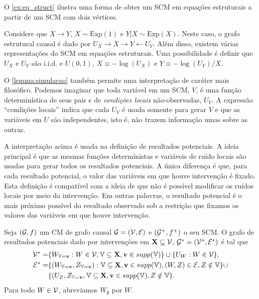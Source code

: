 O \cref{ex:eq_struct} ilustra
uma forma de obter 
um SCM em equações estruturais
a partir de um SCM com dois vértices.
 
\begin{example}
 \label{ex:eq_struct}
 Considere que $X \rightarrow Y$,
 $X \sim \text{Exp}(1)$ e $Y|X \sim \text{Exp}(X)$.
 Neste caso, o grafo estrutural causal é
 dado por $U_X \rightarrow X \rightarrow Y \leftarrow U_Y$.
 Além disso, existem várias representações do SCM
 em equações estruturais. Uma possibilidade é
 definir que $U_X$ e $U_Y$ são i.i.d. e $U(0,1)$,
 $X \equiv -\log(U_X)$ e $Y \equiv -\log(U_Y)/X$.
\end{example}
 
O \cref{lemma:simulacao} também permite
uma interpretação de caráter mais filosófico.
Podemos imaginar que toda variável em um SCM, $V$, é
uma função determinística de seus pais e
de \textit{condições locais} não-observadas, $U_V$.
A expressão ``condições locais'' indica que
cada $U_V$ é usada somente para gerar $V$ e que
as variáveis em $U$ são independentes, isto é,
não trazem informação umas sobre as outras.

A interpretação acima é usada
na definição de resultados potenciais.
A ideia principal é que 
as mesmas funções determínistas e
variáveis de ruído locais são usadas
para gerar todos os resultados potenciais.
A única diferença é que,
para cada resultado potencial,
o valor das variáveis em que 
houve intervenção é fixado.
Esta definição é compatível com 
a ideia de que não é possível modificar
os ruídos locais por meio da intervenção.
Em outras palavras, 
o resultado potencial é o mais próximo possível
do resultado observado sob a restrição que
fixamos os valores das variáveis em que
houve intervenção.

\begin{definition}
 \label{def:grafo_potencial}
 Seja $({\mathcal G}, f)$ um CM de grafo causal 
 ${\mathcal G} = ({\mathcal V}, {\mathcal E})$ e
 $({\mathcal G}^+, f^+)$ o seu SCM.
 O grafo de resultados potenciais dado
 por intervenções em ${\mathbf{X}} \subseteq {\mathcal V}$,
 ${\mathcal G}^* = ({\mathcal V}^*, {\mathcal E}^*)$ é tal que
 \begin{align*}
  {\mathcal V}^* =& \{W_{{\mathbb V}={\mathbf{v}}}: W \in {\mathcal V}, {\mathbb V} \subseteq {\mathbf{X}}, {\mathbf{v}} \in supp({\mathbb V})\} \cup \{U_W: W \in {\mathcal V}\}, \\
  {\mathcal E}^* =& \{(W_{{\mathbb V}={\mathbf{v}}}, Z_{{\mathbb V}={\mathbf{v}}}): {\mathbb V} \subseteq {\mathbf{X}}, {\mathbf{v}} \in supp({\mathbb V}),
  (W, Z) \in {\mathcal E}, Z \notin {\mathbb V}\} \cup \\
  &\{(U_Z, Z_{{\mathbb V}={\mathbf{v}}}, {\mathbb V} \subseteq {\mathbf{X}}, {\mathbf{v}} \in supp({\mathbb V}), Z \notin {\mathbb V} \} .
 \end{align*}
 Para todo $W \in {\mathcal V}$, abreviamos $W_{\emptyset}$ por $W$.
\end{definition}
 
